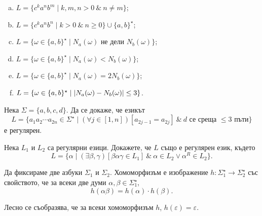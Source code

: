 \begin{problem}
\begin{enumerate}[a)]
  \item
    $L = \{c^ka^nb^m \mid k,m,n > 0\ \&\ n \neq m\}$;
  \item
    $L = \{c^ka^nb^n \mid k > 0\ \&\ n \geq 0\}\cup\{a,b\}^\star$;
  \item
    $L = \{\omega \in \{a,b\}^\star \mid N_a(\omega)\text{ не дели }N_b(\omega)\}$;
  \item
    $L = \{\omega \in \{a,b\}^\star \mid N_a(\omega) < N_b(\omega)\}$;
  \item
    $L = \{\omega \in \{a,b\}^\star \mid N_a(\omega) = 2N_b(\omega)\}$;
  \item
    $L = \{\omega \in \{a,b\}^\star \mid \lvert{N_a(\omega) - N_b(\omega)}\rvert \leq 3\}$.
  \end{enumerate}
\end{problem}


\begin{problem}
  Нека $\Sigma = \{a,b,c,d\}$.
  Да се докаже, че езикът
  \[L = \{a_1a_2\cdots a_{2n} \in \Sigma^\star \mid (\forall j \in [1,n])[a_{2j-1} = a_{2j}]\ \&\ d\text{ се среща $\leq 3$ пъти}\}\]
  е регулярен.
\end{problem}

\begin{problem}
  Нека $L_1$ и $L_2$ са регулярни езици. Докажете, че $L$ също е регулярен език, където
  \[L = \{\alpha \mid (\exists \beta,\gamma)[\beta\alpha\gamma \in L_1]\ \&\ \alpha \in L_2 \vee \alpha^R \in L_2\}.\]
\end{problem}

\begin{dfn}
  Да фиксираме две азбуки $\Sigma_1$ и $\Sigma_2$.
  Хомоморфизъм е изображение $h:\Sigma^\star_1 \to \Sigma^\star_2$ със свойството, че
  за всеки две думи $\alpha,\beta\in\Sigma^\star_1$,
  \[h(\alpha\beta) = h(\alpha)\cdot h(\beta).\]
\end{dfn}

Лесно се съобразява, че за всеки хомоморфизъм $h$, $h(\varepsilon) = \varepsilon$.

